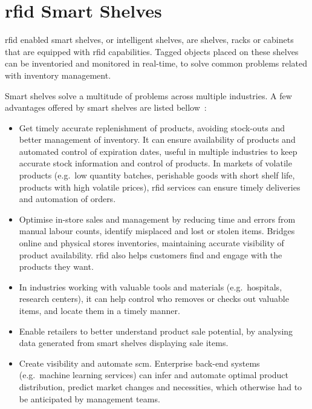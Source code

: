 \chapter{\acs{rfid} Smart Shelves} \label{sec:smartshelves}

\ac{rfid} enabled smart shelves, or intelligent shelves, are shelves, racks or cabinets that are equipped with \ac{rfid} capabilities.
Tagged objects placed on these shelves can be inventoried and monitored in real-time, to solve common problems related with inventory management.

Smart shelves solve a multitude of problems across multiple industries. A few advantages offered by smart shelves are listed bellow~\cite{lahiriRFIDSourcebook2005, WhatYouNeed, FutureRetailShopping, SmartShelvesKey2019}:

\begin{itemize}
    \item Get timely accurate replenishment of products, avoiding stock-outs and better management of inventory. It can ensure availability of products and automated control of expiration dates, useful in multiple industries to keep accurate stock information and control of products. In markets of volatile products (e.g.\ low quantity batches, perishable goods with short shelf life, products with high volatile prices), \ac{rfid} services can ensure timely deliveries and automation of orders.
    \item Optimise in-store sales and management by reducing time and errors from manual labour counts, identify misplaced and lost or stolen items. Bridges online and physical stores inventories, maintaining accurate visibility of product availability. \ac{rfid} also helps customers find and engage with the products they want.
    \item In industries working with valuable tools and materials (e.g.\ hospitals, research centers), it can help control who removes or checks out valuable items, and locate them in a timely manner.
    \item Enable retailers to better understand product sale potential, by analysing data generated from smart shelves displaying sale items.
    \item Create visibility and automate \ac{scm}. Enterprise back-end systems (e.g.\ machine learning services) can infer and automate optimal product distribution, predict market changes and necessities, which otherwise had to be anticipated by management teams.
\end{itemize}


